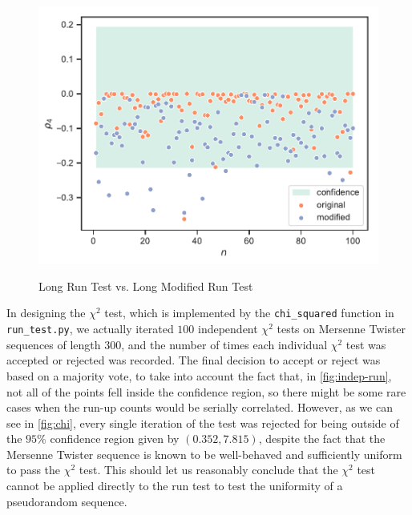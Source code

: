 \documentclass{article}
\begin{document}
\begin{enumerate}
\begin{enumerate}
                \begin{figure}[H]
                    \centering
                    \caption{Long Run Test vs. Long Modified Run Test}
                    \includegraphics[scale=1]{../figures/indep-run-test.pdf}
                    \label{fig:indep-run}
                \end{figure}

                In designing the $\chi^2$ test, which is implemented by the \texttt{chi\_squared} function in \texttt{run\_test.py}, we actually iterated $100$
                independent $\chi^2$ tests on Mersenne Twister sequences of length $300$, and the number of times each individual $\chi^2$ test was accepted or rejected
                was recorded.
                The final decision to accept or reject was based on a majority vote, to take into account the fact that, in \autoref{fig:indep-run},
                not all of the points fell inside the confidence region, so there might be some rare cases when the run-up counts would be serially correlated.
                However, as we can see in \autoref{fig:chi}, every single iteration of the test was rejected for being outside of the $95\%$ confidence region
                given by $(0.352, 7.815)$, despite the fact that the Mersenne Twister sequence is known to be well-behaved and sufficiently uniform to pass the $\chi^2$ test.
                This should let us reasonably conclude that the $\chi^2$ test cannot be applied directly to the run test to test the uniformity of a pseudorandom sequence.


\end{enumerate}
\end{enumerate}
\end{document}
